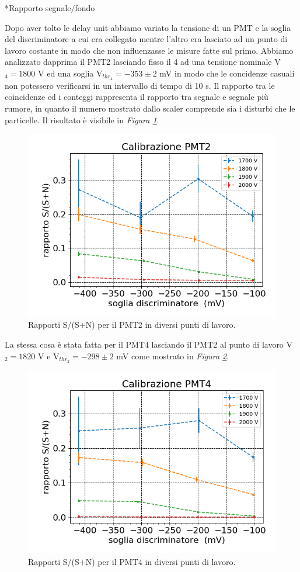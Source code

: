 \documentclass[12pt, a4paper]{article}
\begin{document}
\begin{section}*{Rapporto segnale$/$fondo}

Dopo aver tolto le delay unit abbiamo variato la tensione di un PMT  e la soglia del discriminatore a cui era collegato mentre l'altro era lasciato ad un punto di lavoro costante in modo che non influenzasse le misure fatte sul primo. Abbiamo analizzato dapprima il PMT2 lasciando fisso il 4 ad una tensione nominale V$_4=1800$\! V ed una soglia V$_{thr_4}=-353\pm2$\! mV in modo che le concidenze casuali non potessero verificarsi in un intervallo di tempo di 10\! s. 
Il rapporto tra le coincidenze ed i conteggi rappresenta il rapporto tra segnale e segnale più rumore, in quanto il numero mostrato dallo scaler comprende sia i disturbi che le particelle. Il risultato è visibile in \emph{Figura \ref{test1}}.

\begin{figure}[h]
\centering
\includegraphics[width=8 cm]{calib_pmt2}
\caption{Rapporti S/(S+N) per il PMT2 in diversi punti di lavoro.}
\label{test1}
\end{figure}

La stessa cosa è stata fatta per il PMT4 lasciando il PMT2 al punto di lavoro V$_2=1820$\! V e V$_{thr_2}=-298\pm2$\! mV come mostrato in \emph{Figura \ref{test2}}.

\begin{figure}[h]
\centering
\includegraphics[width=8 cm]{calib_pmt4}
\caption{Rapporti S/(S+N) per il PMT4 in diversi punti di lavoro.}
\label{test2}
\end{figure}

\end{section}
\end{document}
